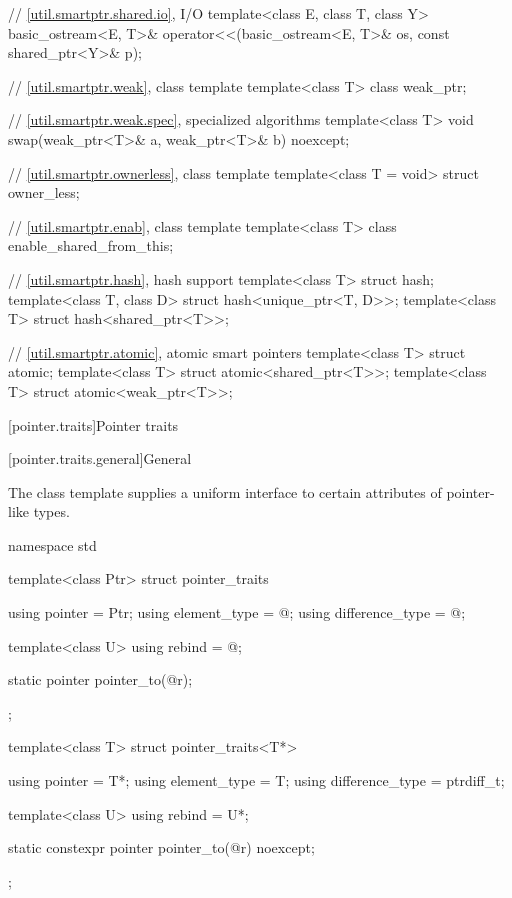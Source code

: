 \begin{codeblock}
{  // \ref{util.smartptr.shared.io},  I/O
  template<class E, class T, class Y>
    basic_ostream<E, T>& operator<<(basic_ostream<E, T>& os, const shared_ptr<Y>& p);

  // \ref{util.smartptr.weak}, class template 
  template<class T> class weak_ptr;

  // \ref{util.smartptr.weak.spec},  specialized algorithms
  template<class T> void swap(weak_ptr<T>& a, weak_ptr<T>& b) noexcept;

  // \ref{util.smartptr.ownerless}, class template 
  template<class T = void> struct owner_less;

  // \ref{util.smartptr.enab}, class template 
  template<class T> class enable_shared_from_this;

  // \ref{util.smartptr.hash}, hash support
  template<class T> struct hash;
  template<class T, class D> struct hash<unique_ptr<T, D>>;
  template<class T> struct hash<shared_ptr<T>>;

  // \ref{util.smartptr.atomic}, atomic smart pointers
  template<class T> struct atomic;
  template<class T> struct atomic<shared_ptr<T>>;
  template<class T> struct atomic<weak_ptr<T>>;
}
\end{codeblock}

[pointer.traits]{Pointer traits}

[pointer.traits.general]{General}

\pnum
The class template  supplies a uniform interface to certain
attributes of pointer-like types.

%
\begin{codeblock}
namespace std {
  template<class Ptr> struct pointer_traits {
    using pointer         = Ptr;
    using element_type    = @\seebelow@;
    using difference_type = @\seebelow@;

    template<class U> using rebind = @\seebelow@;

    static pointer pointer_to(@\seebelow@ r);
  };

  template<class T> struct pointer_traits<T*> {
    using pointer         = T*;
    using element_type    = T;
    using difference_type = ptrdiff_t;

    template<class U> using rebind = U*;

    static constexpr pointer pointer_to(@\seebelow@ r) noexcept;
  };
}
\end{codeblock}

